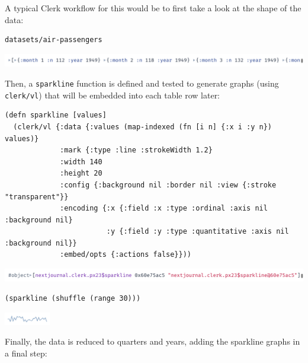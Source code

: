 \documentclass[sigconf,screen,pbalance=true]{acmart}
\newcommand{\passthrough}[1]{#1}
\begin{document}
A typical Clerk workflow for this would be to first take a look at the shape of the data:

\begin{minipage}{\linewidth}
\begin{lstlisting}
datasets/air-passengers
\end{lstlisting}
\end{minipage}

\includegraphics{images/anon-expr-5drcDeJRcpX2uPqZi7XJch2DedHM6j-result.png}

Then, a \passthrough{\lstinline!sparkline!} function is defined and tested to generate graphs (using \passthrough{\lstinline!clerk/vl!}) that will be embedded into each table row later:

\begin{minipage}{\linewidth}
\begin{lstlisting}
(defn sparkline [values]
  (clerk/vl {:data {:values (map-indexed (fn [i n] {:x i :y n}) values)}
             :mark {:type :line :strokeWidth 1.2}
             :width 140
             :height 20
             :config {:background nil :border nil :view {:stroke "transparent"}}
             :encoding {:x {:field :x :type :ordinal :axis nil :background nil}
                        :y {:field :y :type :quantitative :axis nil :background nil}}
             :embed/opts {:actions false}}))
\end{lstlisting}
\end{minipage}

\includegraphics{images/sparkline-result.png}

\begin{minipage}{\linewidth}
\begin{lstlisting}
(sparkline (shuffle (range 30)))
\end{lstlisting}
\end{minipage}

\includegraphics[width=0.15\textwidth]{images/anon-expr-5dr3uWTA777Ny4ajSWGaWCymacQXhQ-result.png}

Finally, the data is reduced to quarters and years, adding the sparkline graphs in a final step:
\end{document}
